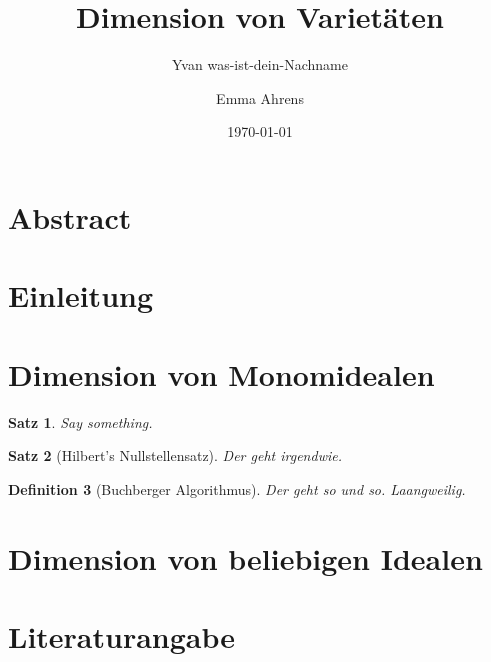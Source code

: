 \documentclass{article}
\title{Dimension von Varietäten}
\date{\today}
\author{Yvan was-ist-dein-Nachname \and Emma Ahrens}
\newtheorem{satz}{Satz}
\newtheorem{definition}[satz]{Definition}
\begin{document}
\maketitle
\tableofcontents

\section{Abstract}
\section{Einleitung}
\section{Dimension von Monomidealen}

\begin{satz}
Say something.
\end{satz}

\begin{satz}[Hilbert's Nullstellensatz]
Der geht irgendwie.
\end{satz}

\begin{definition}[Buchberger Algorithmus]
Der geht so und so. Laangweilig.
\end{definition}

\section{Dimension von beliebigen Idealen}
\section{Literaturangabe}
\end{document}
